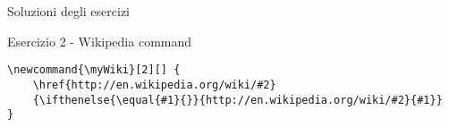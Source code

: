 \begin{frame}[fragile]{Soluzioni degli esercizi}

\begin{block}{Esercizio 2 - Wikipedia command}

\begin{lstlisting}
\newcommand{\myWiki}[2][] {
	\href{http://en.wikipedia.org/wiki/#2}
	{\ifthenelse{\equal{#1}{}}{http://en.wikipedia.org/wiki/#2}{#1}}
}
\end{lstlisting}

\end{block}

\end{frame}
